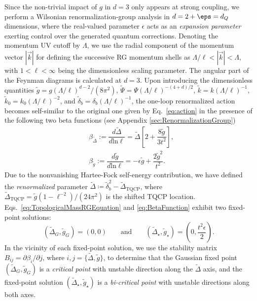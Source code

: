 \documentclass[reprint,floatfix, twocolumn]{revtex4-1}
\begin{document}
Since the non-trivial impact of $g$ in $d=3$ only appears at strong coupling, we perform a Wilsonian renormalization-group analysis in $d =  2 + \eps = d_Q$ dimensions, {where the real-valued parameter $\epsilon$ acts as an \textit{expansion parameter} exerting control over the generated} quantum corrections.
Denoting the momentum UV cutoff by $\Lambda$, we use the radial component of the momentum vector $|\vec{k}|$  for defining the successive RG momentum shells as $\Lambda/\ell<|\vec{k}|<\Lambda$, with $1<\ell<\infty$ being the dimensionless scaling parameter.
The angular part of the  Feynman diagrams is calculated at $d=3$. Upon introducing the dimensionless quantities $\widetilde g=g(\Lambda/\ell)^{d-2}/(8\pi^2)$, $\widetilde\Psi=\Psi(\Lambda/\ell)^{-(4+d)/2}$, $\widetilde k=k(\Lambda/\ell)^{-1}$,
$\widetilde k_0=k_0(\Lambda/\ell)^{-2}$,
and $\widetilde{\delta}_b=\delta_b(\Lambda/\ell)^{-1}$, the one-loop renormalized action becomes self-similar to the original one given by Eq.~\eqref{eq:action} in the presence of the following two beta functions (see Appendix \ref{sec:RenormalizationGroup})
\begin{align}
& \beta_{\widetilde\Delta}:=\dfrac{d\widetilde\Delta}{d\text{ln}\ell} = \widetilde\Delta\left[2+\dfrac{8\widetilde{g}}{3t^2}\right], \label{eq:TopologicalMassRGEquation} \\
& \beta_{\widetilde g}:=\dfrac{d\widetilde g}{d\text{ln}\ell} = -\epsilon\widetilde g+\dfrac{2\widetilde{g}^2}{t^2}. \label{eq:BetaFunction}
\end{align}
Due to the nonvanishing Hartee-Fock self-energy contribution, we have defined the \textit{renormalized} {parameter} $\widetilde\Delta \coloneqq \widetilde\delta^2_b-\widetilde \Delta_\text{TQCP}$, where $\widetilde\Delta_\text{TQCP}=\widetilde g(1-\ell^{-2})/(24\pi^2)$  is the shifted TQCP location. Eqs.~\eqref{eq:TopologicalMassRGEquation} and \eqref{eq:BetaFunction} exhibit two fixed-point solutions:
\begin{equation}\label{eq:FixedPointSolutions}
(\widetilde\Delta_G,\widetilde{g}_G)=(0,0)\qquad\text{and}\qquad(\widetilde\Delta_\star,\widetilde{g}_{\star})=\left(0,\dfrac{t^2\epsilon}{2}\right).
\end{equation}
In the vicinity of each fixed-point solution, we use the stability matrix 
$B_{ij}=\partial \beta_i/\partial j$, where $i,j=\{\widetilde\Delta,\widetilde g\}$,
to determine that the Gaussian fixed point $(\widetilde\Delta_G,\widetilde{g}_G)$ is a \textit{critical point} with unstable direction along the $\widetilde\Delta$ axis, and the fixed-point solution $(\widetilde\Delta_\star,\widetilde{g}_{\star})$ is a \textit{bi-critical point} with unstable directions along both axes. 
\end{document}
